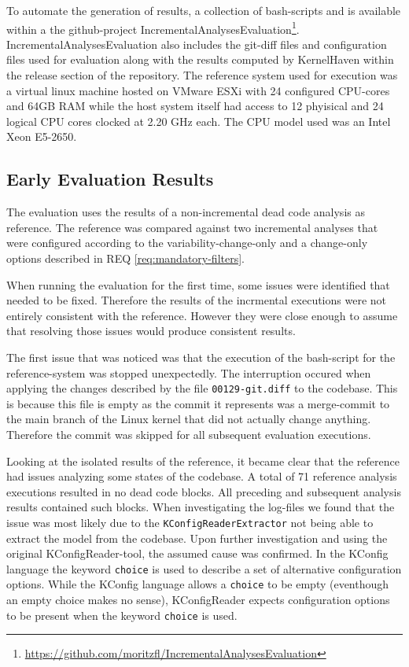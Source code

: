 \documentclass[a4paper]{article}
\begin{document}
To automate the generation of results, a collection of bash-scripts and is available within a the github-project IncrementalAnalysesEvaluation\footnote{\url{https://github.com/moritzfl/IncrementalAnalysesEvaluation}}. IncrementalAnalysesEvaluation also includes the git-diff files and  configuration files used for evaluation along with the results computed by KernelHaven within the release section of the repository. The reference system used for execution was a virtual linux machine hosted on VMware ESXi \cite{ESXi-f0l} with 24 configured CPU-cores and 64GB RAM while the host system itself had access to 12 phyisical and 24 logical CPU cores clocked at 2.20 GHz each. The CPU model used was an Intel Xeon E5-2650.

\subsection{Early Evaluation Results} \label{early-evaluation-results}

The evaluation uses the results of a non-incremental dead code analysis as reference.  The reference was compared against two incremental analyses that were configured according to the variability-change-only and a change-only options described in REQ \ref{req:mandatory-filters}. 

When running the evaluation for the first time, some issues were identified that needed to be fixed. Therefore the results of the incrmental executions were not entirely consistent with the reference. However they were close enough to assume that resolving those issues would produce consistent results.

The first issue that was noticed was that the execution of the bash-script for the reference-system was stopped unexpectedly. The interruption occured when applying the changes described by the file \texttt{00129-git.diff} to the codebase. This is because this file is empty as the commit it represents was a merge-commit to the main branch of the Linux kernel that did not actually change anything. Therefore the commit was skipped for all subsequent evaluation executions.

Looking at the isolated results of the reference, it became clear that the reference had issues analyzing some states of the codebase. A total of 71 reference analysis executions resulted in no dead code blocks. All preceding and subsequent analysis results contained such blocks. When investigating the log-files we found that the issue was most likely due to the \texttt{KConfigReaderExtractor} not being able to extract the model from the codebase. Upon further investigation and using the original KConfigReader-tool, the assumed cause was confirmed. In the KConfig language the keyword \texttt{choice} is used to describe a set of alternative configuration options. While the KConfig language allows a \texttt{choice} to be empty (eventhough an empty choice makes no sense), KConfigReader expects configuration options to be present when the keyword \texttt{choice} is used. 
\end{document}
